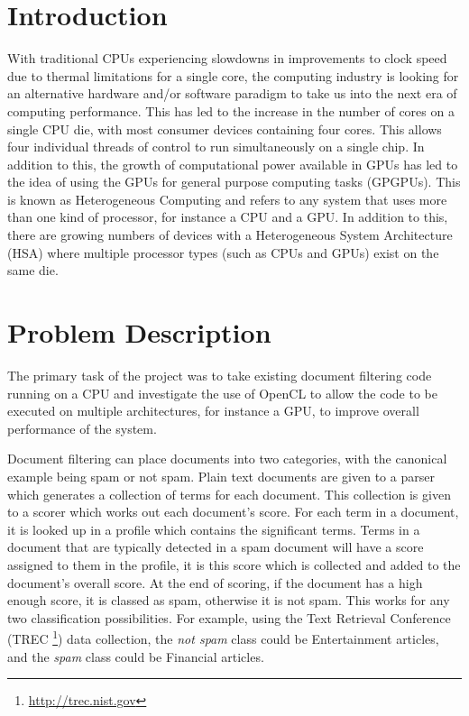 \section{Introduction}

With traditional CPUs experiencing slowdowns in improvements to clock speed due
to thermal limitations for a single core, the computing industry is looking for
an alternative hardware and/or software paradigm to take us into the next era of
computing performance. This has led to the increase in the number of cores on a
single CPU die, with most consumer devices containing four cores. This allows
four individual threads of control to run simultaneously on a single chip. In
addition to this, the growth of computational power available in GPUs has led to
the idea of using the GPUs for general purpose computing tasks (GPGPUs). This is
known as Heterogeneous Computing and refers to any system that uses more than
one kind of processor, for instance a CPU and a GPU. In addition to this, there
are growing numbers of devices with a Heterogeneous System Architecture (HSA)
where multiple processor types (such as CPUs and GPUs) exist on the same die.

\section{Problem Description}

The primary task of the project was to take existing document filtering code
running on a CPU and investigate the use of OpenCL to allow the code to be
executed on multiple architectures, for instance a GPU, to improve overall
performance of the system.

Document filtering can place documents into two categories, with the canonical
example being spam or not spam. Plain text documents are given to a parser which
generates a collection of terms for each document. This collection is given to a
scorer which works out each document's score. For each term in a document, it is
looked up in a profile which contains the significant terms. Terms in a document
that are typically detected in a spam document will have a score assigned to
them in the profile, it is this score which is collected and added to the
document's overall score. At the end of scoring, if the document has a high
enough score, it is classed as spam, otherwise it is not spam. This works for
any two classification possibilities. For example, using the Text Retrieval
Conference (TREC \footnote{\url{http://trec.nist.gov}}) data collection, the
\emph{not spam} class could be Entertainment articles, and the \emph{spam}
class could be Financial articles.


